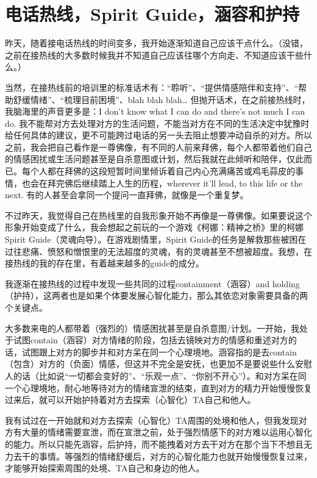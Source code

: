 \chapter{电话热线，Spirit Guide，涵容和护持}


昨天，随着接电话热线的时间变多，我开始逐渐知道自己应该干点什么。（没错，之前在接热线的大多数时候我并不知道自己应该往哪个方向走、不知道应该干些什么。）

当然，在接热线前的培训里的标准话术有：“聆听”、“提供情感陪伴和支持”、“帮助舒缓情绪”、“梳理目前困境”、blah blah blah… 但抛开话术，在之前接热线时，我脑海里的声音更多是：I don't know what I can do and there's not much I can do. 我不能帮对方去处理对方的生活问题，不能当对方在不同的生活决定中犹豫时给任何具体的建议，更不可能跨过电话的另一头去阻止想要冲动自杀的对方。所以之前，我会把自己看作是一尊佛像，有不同的人前来拜佛，每个人都带着他们自己的情感困扰或生活问题甚至是自杀意图或计划，然后我就在此倾听和陪伴，仅此而已。每个人都在拜佛的这段短暂时间里倾诉着自己内心充满痛苦或鸡毛蒜皮的事情，也会在拜完佛后继续踏上人生的历程，wherever it'll lead, to this life or the next. 有的人甚至会拿同一个提问一直拜佛，就像是一个重复梦。

不过昨天，我觉得自己在热线里的自我形象开始不再像是一尊佛像。如果要说这个形象开始变成了什么，我会想起之前玩的一个游戏《柯娜：精神之桥》里的柯娜\pozhehao{}Spirit Guide（灵魂向导）。在游戏剧情里，Spirit Guide的任务是解救那些被困在过往悲痛、愤怒和憎恨里的无法超度的灵魂，有的灵魂甚至不想被超度。我想，在接热线的我的存在里，有着越来越多的guide的成分。

我逐渐在接热线的过程中发现一些共同的过程\pozhehao{}containment（涵容）and holding（护持），这两者也是如果个体要发展心智化能力，那么其依恋对象需要具备的两个关键点。

大多数来电的人都带着（强烈的）情感困扰甚至是自杀意图/计划。一开始，我处于试图contain（涵容）对方情绪的阶段，包括去镜映对方的情感和重述对方的话，试图跟上对方的脚步并和对方呆在同一个心理境地。涵容指的是去contain（包含）对方的（负面）情感，但这并不完全是安抚，也更加不是要说些什么安慰人的话（比如说“一切都会变好的”、“乐观一点”、“你别不开心”）。和对方呆在同一个心理境地，耐心地等待对方的情绪宣泄的结束，直到对方的精力开始慢慢恢复过来后，就可以开始护持着对方去探索（心智化）TA自己和他人。

我有试过在一开始就和对方去探索（心智化）TA周围的处境和他人，但我发现对方有大量的情绪需要宣泄，而在宣泄之前，处于强烈情感下的对方难以运用心智化的能力。所以只能先涵容，后护持，而不能拽着对方去干对方在那个当下不想且无力去干的事情。等强烈的情绪舒缓后，对方的心智化能力也就开始慢慢恢复过来，才能够开始探索周围的处境、TA自己和身边的他人。

